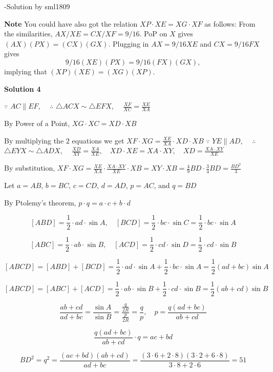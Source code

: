 \begin{enumerate}
 -Solution by sml1809

 \textbf{Note} You could have also got the relation $XP \cdot XE = XG \cdot XF$ as follows: From the similarities, $AX/XE = CX/XF = 9/16$. PoP on $X$ gives $(AX)(PX) = (CX)(GX)$. Plugging in $AX = 9/16 XE$ and $CX=9/16 FX$ gives
 \[9/16 (XE)(PX) = 9/16(FX)(GX),\]implying that $(XP)(XE) = (XG)(XP)$.

 



\textbf{Solution 4}

$\because$ $AC 	\parallel EF$, $\quad \therefore$ $\triangle ACX \sim \triangle EFX$, $\quad \frac{XF}{XC} = \frac{XE}{XA}$

 By Power of a Point, $XG \cdot XC = XD \cdot XB$

 By multiplying the $2$ equations we get $XF \cdot XG = \frac{XE}{XA} \cdot XD \cdot XB$
$\because$ $YE 	\parallel AD$, $\quad \therefore$ $\triangle EYX \sim \triangle ADX$, $\quad \frac{XD}{XY} = \frac{XA}{XE}, \quad XD \cdot XE = XA \cdot XY, \quad XD = \frac{XA \cdot XY}{XE}$

 By substitution, $XF \cdot XG = \frac{XE}{XA} \cdot \frac{XA \cdot XY}{XE} \cdot XB = XY \cdot XB = \frac{4}{9} BD \cdot \frac{3}{4} BD = \frac{BD^2}{3}$

 Let $a = AB$, $b = BC$, $c = CD$, $d = AD$, $p = AC$, and $q = BD$

 By Ptolemy's theorem, $p \cdot q = a \cdot c + b \cdot d$

 \[[ABD] = \frac12 \cdot ad \cdot \sin A, \quad [BCD] = \frac12 \cdot bc \cdot \sin C = \frac12 \cdot bc \cdot \sin A\]

 \[[ABC] = \frac12 \cdot ab \cdot \sin B, \quad [ACD] = \frac12 \cdot cd \cdot \sin D = \frac12 \cdot cd \cdot \sin B\]

 \[[ABCD] = [ABD] + [BCD] = \frac12 \cdot ad \cdot \sin A + \frac12 \cdot bc \cdot \sin A = \frac12 (ad + bc) \sin A\]

 \[[ABCD] = [ABC] + [ACD] = \frac12 \cdot ab \cdot \sin B + \frac12 \cdot cd \cdot \sin B = \frac12 (ab + cd) \sin B\]

 \[\frac{ab + cd}{ad + bc} = \frac{ \sin A }{ \sin B} = \frac{ \frac{q}{2R} }{ \frac{p}{2R} } = \frac{q}{p}, \quad p = \frac{q(ad + bc)}{ab + cd}\]

 \[\frac{q(ad + bc)}{ab + cd} \cdot q = ac + bd\]

 \[BD^2 = q^2 = \frac{ (ac + bd)(ab + cd) }{ad + bc} = \frac{(3 \cdot 6 + 2 \cdot 8)(3 \cdot 2 + 6 \cdot 8)}{3 \cdot 8 + 2 \cdot 6} = 51\]


\end{enumerate}
